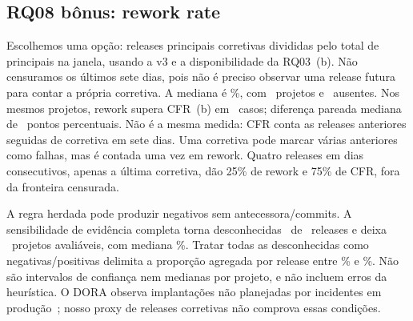 \subsection{RQ08 bônus: rework rate}

Escolhemos uma opção: releases principais corretivas divididas pelo total de
principais na janela, usando a v3 e a disponibilidade da RQ03~(b). Não censuramos
os últimos sete dias, pois não é preciso observar uma release futura para contar
a própria corretiva. A mediana é \labCReworkMediana\%, com \labCReworkN\ projetos
e \labCReworkAusentes\ ausentes. Nos mesmos projetos, rework supera CFR~(b) em
\labCReworkMaior\ casos; diferença pareada mediana de \labCReworkDifMediana\ pontos
percentuais. Não é a mesma medida: CFR conta as releases anteriores seguidas de
corretiva em sete dias. Uma corretiva pode marcar várias anteriores como falhas,
mas é contada uma vez em rework. Quatro releases em dias consecutivos, apenas a
última corretiva, dão 25\% de rework e 75\% de CFR, fora da fronteira censurada.

A regra herdada pode produzir negativos sem antecessora/commits. A sensibilidade
de evidência completa torna desconhecidas \labCReworkSemEvidencia\ de
\labCReworkTotal\ releases e deixa \labCReworkConservadorN\ projetos avaliáveis,
com mediana \labCReworkConservadorMediana\%. Tratar todas as desconhecidas como
negativas/positivas delimita a proporção agregada por release entre
\labCReworkLimInf\% e \labCReworkLimSup\%. Não são intervalos de confiança nem
medianas por projeto, e não incluem erros da heurística. O DORA observa implantações
não planejadas por incidentes em produção~\cite{doraMetricas}; nosso proxy de releases
corretivas não comprova essas condições.
